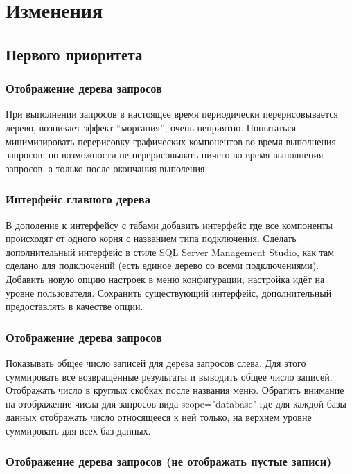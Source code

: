 \section{Изменения}

\subsection{Первого приоритета}

\subsubsection{Отображение дерева запросов}

При выполнении запросов в настоящее время периодически перерисовывается дерево, возникает эффект
``моргания'', очень неприятно. Попытаться минимизировать перерисовку графических компонентов во
время выполнения запросов, по возможности не перерисовывать ничего во время выполнения запросов, а
только после окончания выполения.

\subsubsection{Интерфейс главного дерева}

В дополение к интерфейсу с табами добавить интерфейс где все компоненты происходят от одного корня с
названием типа подключения. Сделать дополнительный интерфейс в стиле SQL Server Management Studio,
как там сделано для подключений (есть единое дерево со всеми подключениями). Добавить новую опцию
настроек в меню конфигурации, настройка идёт на уровне пользователя. Сохранить существующий
интерфейс, дополнительный предоставлять в качестве опции.

\subsubsection{Отображение дерева запросов}

Показывать общее число записей для дерева запросов слева. Для этого суммировать все возвращённые
результаты и выводить общее число записей. Отображать число в круглых скобках после названия меню.
Обратить внимание на отображение числа для запросов вида scope="database" где для каждой базы данных
отображать число относящееся к ней только, на верхнем уровне суммировать для всех баз данных.

\subsubsection{Отображение дерева запросов (не отображать пустые записи)}

